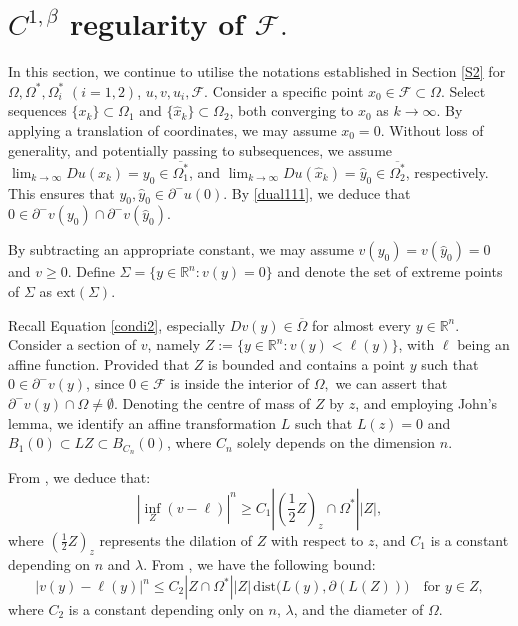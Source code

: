 \documentclass[10pt,a4paper]{amsart}
\theoremstyle{plain}
\newcommand{\0}{\textbf{0}}
\numberwithin{equation}{section}
\numberwithin{equation}{section}
\numberwithin{figure}{section}
\begin{document}
\section{$C^{1,\beta}$ regularity of $\mathcal{F}.$}\label{S3}

In this section, we continue to utilise the notations established in Section \ref{S2} for $\Omega, \Omega^*, \Omega^*_i$ $(i=1,2)$, $u, v, u_i, \mathcal{F}$. Consider a specific point $x_0\in\mathcal{F} \subset \Omega$. Select sequences $\{x_k\} \subset \Omega_1$ and $\{\hat{x}_k\} \subset \Omega_2$, both converging to $x_0$ as $k \to \infty$. By applying a translation of coordinates, we may assume $x_0 = 0$.
Without loss of generality, and potentially passing to subsequences, we assume $\lim_{k\to\infty}Du(x_k)=y_0 \in \overline{\Omega^*_1}$, and $\lim_{k\to\infty}Du(\hat{x}_k)=\hat{y}_0 \in \overline{\Omega^*_2}$, respectively. This ensures that $y_0, \hat{y}_0 \in \partial^{-}u(0).$ By \eqref{dual111}, we deduce that $0\in\partial^{-}v(y_0) \cap \partial^{-}v(\hat{y}_0)$.

By subtracting an appropriate constant, we may assume $v(y_0)=v(\hat{y}_0)=0$ and $v\geq0$. Define $\Sigma = \{y\in\mathbb{R}^n : v(y) = 0\}$ and denote the set of extreme points of \( \Sigma \) as \( \text{ext}(\Sigma) \).  

Recall Equation \eqref{condi2}, especially $Dv(y) \in \overline{\Omega}$ for almost every $y\in \mathbb{R}^n.$ 
Consider a section of \(v\), namely \(Z:=\{y \in \mathbb{R}^n : v(y) < \ell(y)\}\), with \(\ell\) being an affine function. Provided that \(Z\) is bounded and contains a point \(y\) such that \(0 \in \partial^{-}v(y)\), since \(0\in \mathcal{F}\) is inside the interior of \(\Omega,\)
 we can assert that \(\partial^{-}v(y) \cap \Omega \neq\emptyset\). 
 Denoting the centre of mass of \(Z\) by \(z\), and employing John's lemma, we identify an affine transformation \(L\) such that $L(z)=0$ and \(B_1(0) \subset LZ \subset B_{C_n}(0)\), where \(C_n\) solely depends on the dimension \(n\). 

From \cite[Inequality (4)]{FK1}, we deduce that:
\begin{equation}\label{la1}
|\inf_{Z} (v-\ell)|^n \geq C_1 \left| \left( \frac{1}{2}Z \right)_{z} \cap \Omega^* \right| |Z|,
\end{equation}
where $\left(\frac{1}{2}Z\right)_{z}$ represents the dilation of $Z$ with respect to $z$, and $C_1$ is a constant depending on $n$ and $\lambda$.
From \cite[Proposition 1]{FK1}, we have the following bound:
\begin{equation}\label{ua1}
|v(y) - \ell(y)|^n \leq C_2 |Z \cap \Omega^*||Z| \, \text{dist}\big(L(y), \partial(L(Z))\big) \quad\mbox{for } y\in Z,
\end{equation}
where $C_2$ is a constant depending only on $n$, $\lambda$, and the diameter of $\Omega$.
\end{document}
